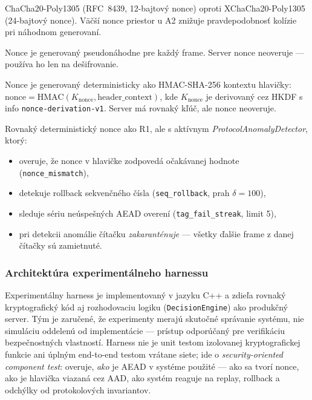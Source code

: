 \begin{description}[leftmargin=*,itemsep=2pt]
  \item[Algoritmus (A1 vs.\ A2):] ChaCha20-Poly1305 (RFC~8439\cite{RFC8439}, 12-bajtový nonce) oproti XChaCha20-Poly1305\cite{XChaChaDraft} (24-bajtový nonce). Väčší nonce priestor u A2 znižuje pravdepodobnosť kolízie pri náhodnom generovaní.
  \item[Režim nonce (R0):] Nonce je generovaný pseudonáhodne pre každý frame. Server nonce neoveruje --- používa ho len na dešifrovanie.
  \item[Režim nonce (R1):] Nonce je generovaný deterministicky ako HMAC-SHA-256 kontextu hlavičky:
  $\text{nonce} = \text{HMAC}(K_{\text{nonce}}, \text{header\_context})$,
  kde $K_{\text{nonce}}$ je derivovaný cez HKDF s info \texttt{nonce-derivation-v1}. Server má rovnaký kľúč, ale nonce neoveruje.
  \item[Režim nonce (R2):] Rovnaký deterministický nonce ako R1, ale s aktívnym \emph{ProtocolAnomalyDetector}, ktorý:
  \begin{itemize}[itemsep=1pt]
    \item overuje, že nonce v hlavičke zodpovedá očakávanej hodnote (\texttt{nonce\_mismatch}),
    \item detekuje rollback sekvenčného čísla (\texttt{seq\_rollback}, prah $\delta = 100$),
    \item sleduje sériu neúspešných AEAD overení (\texttt{tag\_fail\_streak}, limit 5),
    \item pri detekcii anomálie čítačku \emph{zakaranténuje} --- všetky ďalšie frame z danej čítačky sú zamietnuté.
  \end{itemize}
\end{description}

\subsubsection{Architektúra experimentálneho harnessu}
\label{sec:harness}

Experimentálny harness je implementovaný v jazyku C++ a zdieľa rovnaký kryptografický kód aj rozhodovaciu logiku (\texttt{DecisionEngine}) ako produkčný server. Tým je zaručené, že experimenty merajú skutočné správanie systému, nie simuláciu oddelenú od implementácie --- prístup odporúčaný pre verifikáciu bezpečnostných vlastností\cite{NIST80053}. Harness nie je unit testom izolovanej kryptografickej funkcie ani úplným end-to-end testom vrátane siete; ide o \emph{security-oriented component test}: overuje, \emph{ako} je AEAD v systéme použité --- ako sa tvorí nonce, ako je hlavička viazaná cez AAD, ako systém reaguje na replay, rollback a odchýlky od protokolových invariantov.

